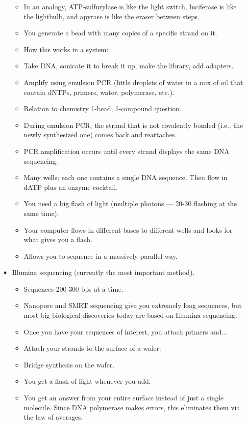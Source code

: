 \documentclass[../notes.tex]{subfiles}
\begin{document}
\begin{itemize}
\begin{itemize}
        \item In an analogy, ATP-sulfurylase is like the light switch, luciferase is like the lightbulb, and apyrase is like the eraser between steps.
        \item You generate a bead with many copies of a specific strand on it.
        \item How this works in a system:
        \item Take DNA, sonicate it to break it up, make the library, add adapters.
        \item Amplify using emulsion PCR (little droplets of water in a mix of oil that contain dNTPs, primers, water, polymerase, etc.).
        \item Relation to chemistry 1-bead, 1-compound question.
        \item During emulsion PCR, the strand that is not covalently bonded (i.e., the newly synthesized one) comes back and reattaches.
        \item PCR amplification occurs until every strand displays the same DNA sequencing.
        \item Many wells; each one contains a single DNA sequence. Then flow in dATP plus an enzyme cocktail.
        \item You need a big flash of light (multiple photons --- 20-30 flashing at the same time).
        \item Your computer flows in different bases to different wells and looks for what gives you a flash.
        \item Allows you to sequence in a massively parallel way.
    \end{itemize}
    \item Illumina sequencing (currently the most important method).
    \begin{itemize}
        \item Sequences 200-300 bps at a time.
        \item Nanopore and SMRT sequencing give you extremely long sequences, but most big biological discoveries today are based on Illumina sequencing.
        \item Once you have your sequences of interest, you attach primers and...
        \item Attach your strands to the surface of a wafer.
        \item Bridge synthesis on the wafer.
        \item You get a flash of light whenever you add.
        \item You get an answer from your entire surface instead of just a single molecule. Since DNA polymerase makes errors, this eliminates them via the law of averages.

\end{itemize}
\end{itemize}
\end{document}

